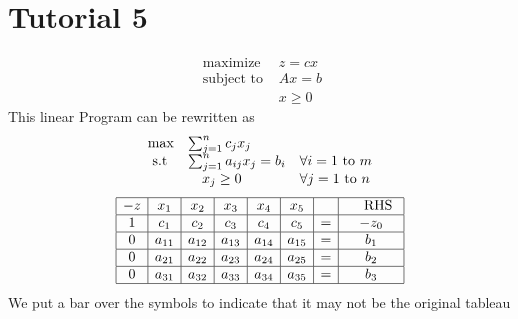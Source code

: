 \documentclass{article}
\begin{document}
\section{Tutorial 5}
$$
\begin{array}{ll}{\text { maximize }} & {z=c x} \\ {\text { subject to }} & {A x=b} \\ {} & {x \geq 0}\end{array}
$$
This linear Program can be rewritten as \\

$$
\begin{array} { l l l } { \max } & { \sum _ { j = 1 } ^ { n } c _ { j } x _ { j } } \\ { \text { s.t } } & { \sum _ { j = 1 } ^ { n } a _ { i j } x _ { j } = b _ { i } } & { \forall i = 1 \text { to } m } \\ { } & { \quad x _ { j } \geq 0 } & { \forall j = 1 \text { to } n } \end{array}
$$
$$
\begin{array} { | c | c | c | c | c | c | c | c | } \hline - z & { x _ { 1 } } & { x _ { 2 } } & { x _ { 3 } } & { x _ { 4 } } & { x _ { 5 } } & &{ \quad \text { RHS } } \\ \hline 1 & { c _ { 1 } } & { c _ { 2 } } & { c _ { 3 } } & { c _ { 4 } } & { c _ { 5 } } & { = } & { - z _ { 0 } } \\ \hline { 0 } & { a _ { 11 } } & { a _ { 12 } } & { a _ { 13 } } & { a _ { 14 } } & { a _ { 15 } } & { = } & { b _ { 1 } } \\ \hline 0 & { a _ { 21 } } & { a _ { 22 } } & { a _ { 23 } } & { a _ { 24 } } & { a _ { 25 } } & { = } & { b _ { 2 } } \\ \hline 0 & { a _ { 31 } } & { a _ { 32 } } & { a _ { 33 } } & { a _ { 34 } } & { a _ { 35 } } & { = } & { b _ { 3 } } \\ \hline \end{array}
$$
We put a bar over the symbols to indicate that it may not be the original tableau
\end{document}
